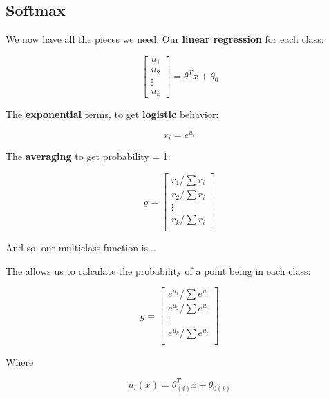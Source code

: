     \subsection*{Softmax}
        
        We now have all the pieces we need. Our \textbf{linear regression} for each class:
        
        \begin{equation}
            \begin{bmatrix}
                u_1 \\ u_2 \\ \vdots \\ u_k
            \end{bmatrix}
            = 
            \theta^T x + \theta_0
        \end{equation}
        
        The \textbf{exponential} terms, to get \textbf{logistic} behavior:
        
        \begin{equation}
            r_i = e^{u_i}
        \end{equation}
        
        The \textbf{averaging} to get probability = 1:
        
        \begin{equation}
            g = 
            \begin{bmatrix}
                r_1/\sum r_i  \\
                r_2/\sum r_i  \\
                \vdots  \\
                r_k/\sum r_i  \\
            \end{bmatrix}
        \end{equation}
        
        And so, our multiclass function is...\\
        
        \begin{definition}
            The  allows us to calculate the probability of a point being in each class:
            
            \begin{equation*}
                g = 
                \begin{bmatrix}
                    e^{u_1}/\sum e^{u_i}  \\
                    e^{u_2}/\sum e^{u_i}  \\
                    \vdots  \\
                    e^{u_k}/\sum e^{u_i}  \\
                \end{bmatrix}
            \end{equation*}
            
            Where
            
            \begin{equation}
                u_i(x) = \theta_{(i)}^T x + \theta_{0(i)}
            \end{equation}
        \end{definition}
        

